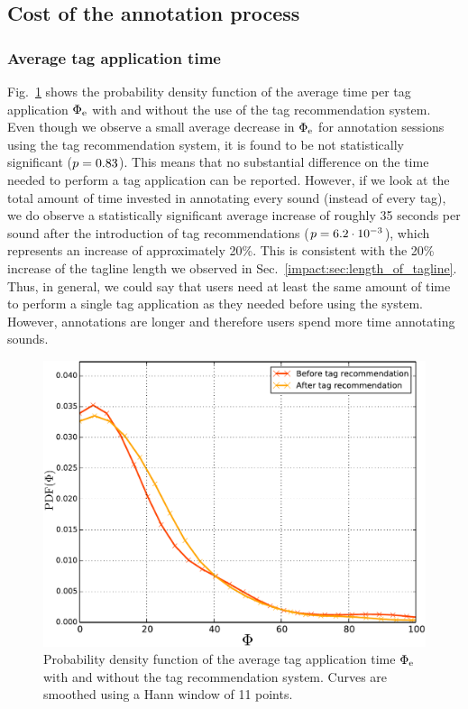 \subsection{Cost of the annotation process}
\label{impact:sec:cost_annotations}


\subsubsection{Average tag application time}

Fig.~\ref{impact:fig:tag_time} shows the probability density function of the average time per tag application $\Phi_{\text{e}}$ with and without the use of the tag recommendation system. Even though we observe a small average decrease in $\Phi_{\text{e}}$ for annotation sessions using the tag recommendation system, it is found to be not statistically significant ($p = 0.83$). This means that no substantial difference on the time needed to perform a tag application can be reported. However, if we look at the total amount of time invested in annotating every sound (instead of every tag), we do observe a statistically significant average increase of roughly 35 seconds per sound after the introduction of tag recommendations ($p = 6.2\cdot 10^{-3}$), which represents an increase of approximately 20\%. This is consistent with the 20\% increase of the tagline length we observed in Sec.~\ref{impact:sec:length_of_tagline}. Thus, in general, we could say that users need at least the same amount of time to perform a single tag application as they needed before using the system. However, annotations are longer and therefore users spend more time annotating sounds.

\begin{figure}
\centerline{\includegraphics[width=0.7\columnwidth]{ch05_impact/pics/fig12_time_pdf}}
\caption[Probability density function of the average tag application time]{Probability density function of the average tag application time $\Phi_{\text{e}}$ with and without the tag recommendation system. Curves are smoothed using a Hann window of 11 points.}
\label{impact:fig:tag_time}
\end{figure}


